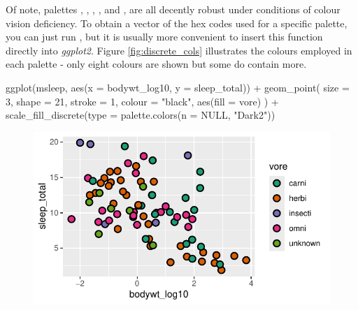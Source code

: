 Of note, palettes , , , , and , are all decently robust under conditions of colour vision deficiency. To obtain a vector of the hex codes used for a specific palette, you can just run , but it is usually more convenient to insert this function directly into \textit{ggplot2}. Figure \ref{fig:discrete_cols} illustrates the colours employed in each palette - only eight colours are shown but some do contain more.

\begin{inR}
ggplot(msleep, aes(x = bodywt_log10, y = sleep_total)) +
  geom_point(
    size = 3, shape = 21, stroke = 1, colour = "black",
    aes(fill = vore)
  ) +
  scale_fill_discrete(type = palette.colors(n = NULL, "Dark2"))
\end{inR}

\vspace{2em}

\begin{figure}[H]
\includegraphics[scale = .75]{graphics/ch2Figs/ggEx_25.pdf}
\end{figure}

\vspace{2em}

